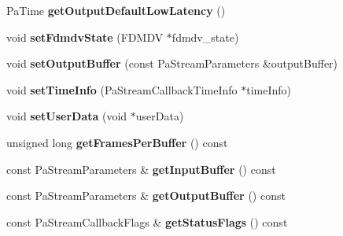 \begin{DoxyCompactItemize}
\item 
\hypertarget{class_port_audio_wrap_a1014d8750069b7dc914e6f836da79660}{Pa\-Time {\bfseries get\-Output\-Default\-Low\-Latency} ()}\label{class_port_audio_wrap_a1014d8750069b7dc914e6f836da79660}

\item 
\hypertarget{class_port_audio_wrap_a65d6263d05a44f6696a3eb93a669e862}{void {\bfseries set\-Fdmdv\-State} (F\-D\-M\-D\-V $\ast$fdmdv\-\_\-state)}\label{class_port_audio_wrap_a65d6263d05a44f6696a3eb93a669e862}

\item 
\hypertarget{class_port_audio_wrap_a2284b3598963428bd5970b69a2ec0370}{void {\bfseries set\-Output\-Buffer} (const Pa\-Stream\-Parameters \&output\-Buffer)}\label{class_port_audio_wrap_a2284b3598963428bd5970b69a2ec0370}

\item 
\hypertarget{class_port_audio_wrap_a4d2bb7132714099aa2a0390f11a57ce6}{void {\bfseries set\-Time\-Info} (Pa\-Stream\-Callback\-Time\-Info $\ast$time\-Info)}\label{class_port_audio_wrap_a4d2bb7132714099aa2a0390f11a57ce6}

\item 
\hypertarget{class_port_audio_wrap_a2bac5a36a40fd1f86df5c1f94e964ac4}{void {\bfseries set\-User\-Data} (void $\ast$user\-Data)}\label{class_port_audio_wrap_a2bac5a36a40fd1f86df5c1f94e964ac4}

\item 
\hypertarget{class_port_audio_wrap_ad2ea7c12d674b8bf882a5a5ffdff7acb}{unsigned long {\bfseries get\-Frames\-Per\-Buffer} () const }\label{class_port_audio_wrap_ad2ea7c12d674b8bf882a5a5ffdff7acb}

\item 
\hypertarget{class_port_audio_wrap_a3e2997d41e53309bfb6b06baabb43a04}{const Pa\-Stream\-Parameters \& {\bfseries get\-Input\-Buffer} () const }\label{class_port_audio_wrap_a3e2997d41e53309bfb6b06baabb43a04}

\item 
\hypertarget{class_port_audio_wrap_abb0273b674c970ee96594dd61f7abfc9}{const Pa\-Stream\-Parameters \& {\bfseries get\-Output\-Buffer} () const }\label{class_port_audio_wrap_abb0273b674c970ee96594dd61f7abfc9}

\item 
\hypertarget{class_port_audio_wrap_a43a6d5f7562fde40166872b77a7804ea}{const Pa\-Stream\-Callback\-Flags \& {\bfseries get\-Status\-Flags} () const }\label{class_port_audio_wrap_a43a6d5f7562fde40166872b77a7804ea}


\end{DoxyCompactItemize}
